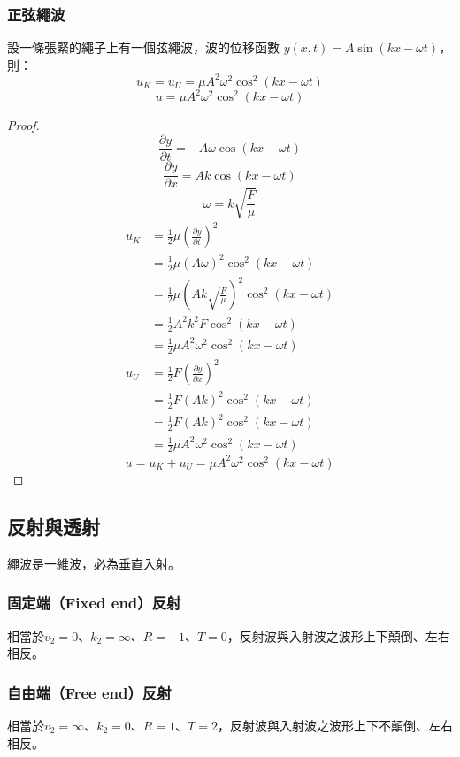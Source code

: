 \documentclass[a4paper,12pt]{report}
\begin{document}
\subsubsection{正弦繩波}
設一條張緊的繩子上有一個弦繩波，波的位移函數 \( y(x,t) = A \sin(kx - \omega t) \)，則：
\[ u_K = u_U = \mu A^2 \omega^2 \cos^2(kx - \omega t) \]
\[ u = \mu A^2 \omega^2 \cos^2(kx - \omega t) \]
\begin{proof}
\[ \frac{\partial y}{\partial t} = -A \omega \cos(kx - \omega t) \]
\[ \frac{\partial y}{\partial x} = A k \cos(kx - \omega t) \]
\[ \omega = k \sqrt{\frac{F}{\mu}} \]
\[\begin{aligned}
u_K &= \frac{1}{2} \mu \left( \frac{\partial y}{\partial t} \right)^2 \\
&= \frac{1}{2} \mu (A \omega)^2 \cos^2(kx - \omega t) \\
&= \frac{1}{2} \mu \left( A k \sqrt{\frac{F}{\mu}} \right)^2 \cos^2(kx - \omega t)\\
&= \frac{1}{2} A^2 k^2 F \cos^2(kx - \omega t)\\
&= \frac{1}{2} \mu A^2 \omega^2 \cos^2(kx - \omega t)\\
u_U &= \frac{1}{2} F \left( \frac{\partial y}{\partial x} \right)^2\\
&= \frac{1}{2} F (A k)^2 \cos^2(kx - \omega t) \\
&=  \frac{1}{2} F (A k)^2 \cos^2(kx - \omega t) \\
&= \frac{1}{2} \mu A^2 \omega^2 \cos^2(kx - \omega t)
\end{aligned}\]
\[ u = u_K + u_U = \mu A^2 \omega^2 \cos^2(kx - \omega t) \]
\end{proof}
\subsection{反射與透射}
繩波是一維波，必為垂直入射。
\subsubsection{固定端（Fixed end）反射}
相當於$v_2=0$、$k_2=\infty$、$R=-1$、$T=0$，反射波與入射波之波形上下顛倒、左右相反。
\subsubsection{自由端（Free end）反射}
相當於$v_2=\infty$、$k_2=0$、$R=1$、$T=2$，反射波與入射波之波形上下不顛倒、左右相反。
\end{document}
